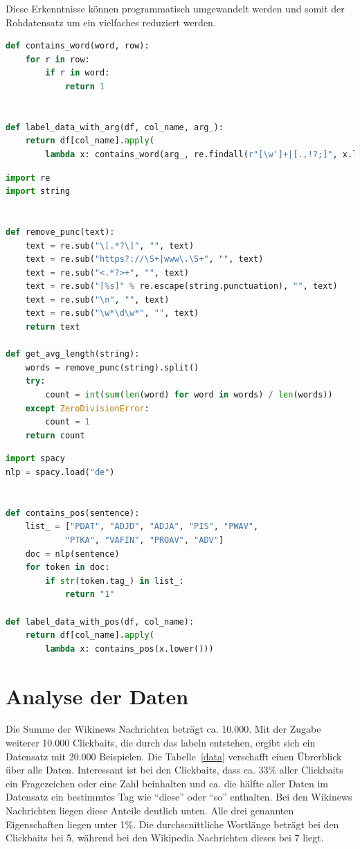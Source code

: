 Diese Erkenntnisse können programmatisch umgewandelt werden und somit der Rohdatensatz um ein vielfaches reduziert werden.


\begin{lstlisting}[language=Python,caption=Funktion welches ein Dataframe je nach Argumenten labelt, label={Label1}]
def contains_word(word, row):
    for r in row:
        if r in word:
            return 1


def label_data_with_arg(df, col_name, arg_):
    return df[col_name].apply(
        lambda x: contains_word(arg_, re.findall(r"[\w']+|[.,!?;]", x.lower())))
\end{lstlisting}

\begin{lstlisting}[language=Python,caption=Funktionen für durchschnittliche Wortlänge und Interpunktion, label={Label2}]
import re
import string


def remove_punc(text):
    text = re.sub("\[.*?\]", "", text)
    text = re.sub("https?://\S+|www\.\S+", "", text)
    text = re.sub("<.*?>+", "", text)
    text = re.sub("[%s]" % re.escape(string.punctuation), "", text)
    text = re.sub("\n", "", text)
    text = re.sub("\w*\d\w*", "", text)
    return text

def get_avg_length(string):
    words = remove_punc(string).split()
    try:
        count = int(sum(len(word) for word in words) / len(words))
    except ZeroDivisionError:
        count = 1
    return count
\end{lstlisting}

\begin{lstlisting}[language=Python,caption=Tagger Funktion, label={Label3}]
import spacy
nlp = spacy.load("de")


def contains_pos(sentence):
    list_ = ["PDAT", "ADJD", "ADJA", "PIS", "PWAV", 
            "PTKA", "VAFIN", "PROAV", "ADV"]
    doc = nlp(sentence)
    for token in doc:
        if str(token.tag_) in list_:
            return "1"

def label_data_with_pos(df, col_name):
    return df[col_name].apply(
        lambda x: contains_pos(x.lower()))
\end{lstlisting}


\section{Analyse der Daten}\label{sectionAnalyse}
Die Summe der Wikinews Nachrichten beträgt ca. 10.000. Mit der Zugabe weiterer 10.000 Clickbaits, die durch das labeln entstehen, ergibt sich ein Datensatz mit 20.000 Beispielen. Die Tabelle~\ref{data} verschafft einen Übrerblick über alle Daten. Interessant ist bei den Clickbaits, dass ca. 33\% aller Clickbaits ein Fragezeichen oder eine Zahl beinhalten und ca. die hälfte aller Daten im Datensatz ein bestimmtes Tag wie \enquote{diese} oder \enquote{so} enthalten. Bei den Wikinews Nachrichten liegen diese Anteile deutlich unten. Alle drei genannten Eigenschaften liegen unter 1\%. Die durchscnittliche Wortlänge beträgt bei den Clickbaits bei 5, während bei den Wikipedia Nachrichten dieses bei 7 liegt.

